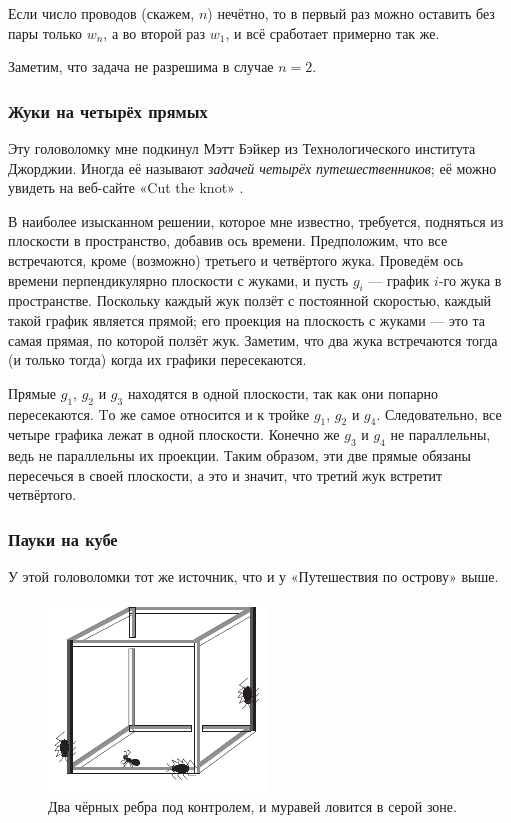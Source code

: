 Если число проводов (скажем, $n$) нечётно, то в первый раз можно оставить без пары только $w_n$, а во второй раз $w_1$, и всё сработает примерно так же.

\begin{addedbytheeditors}
Заметим, что задача не разрешима в случае $n=2$.
\end{addedbytheeditors}




\subsubsection*{Жуки на четырёх прямых}

Эту головоломку мне подкинул Мэтт Бэйкер из Технологического института Джорджии.
Иногда её называют \emph{задачей четырёх путешественников};
её можно увидеть на веб-сайте «Cut the knot» \cite{cut-the-knot}.

В наиболее изысканном решении, которое мне известно, требуется, подняться из плоскости в пространство, добавив ось времени.
Предположим, что все встречаются, кроме (возможно) третьего и четвёртого жука.
Проведём ось времени перпендикулярно плоскости с жуками, и пусть $g_i$ --- график $i$-го жука в пространстве.
Поскольку каждый жук ползёт с постоянной скоростью, каждый такой график является прямой;
его проекция на плоскость с жуками --- это та самая прямая, по которой ползёт жук.
Заметим, что два жука встречаются тогда (и только тогда) когда их графики пересекаются.

Прямые $g_1$, $g_2$ и $g_3$ находятся в одной плоскости, так как они попарно пересекаются.
Tо же самое относится и к тройке  $g_1$, $g_2$ и $g_4$.
Следовательно, все четыре графика лежат в одной плоскости.
Конечно же $g_3$ и $g_4$ не параллельны, ведь не параллельны их проекции.
Таким образом, эти две прямые обязаны пересечься в своей плоскости,
а это и значит, что третий жук встретит четвёртого.

\subsubsection*{Пауки на кубе}

У этой головоломки тот же источник, что и у «Путешествия по острову» выше.

\begin{figure}[ht!]
\centering
\includegraphics[scale=1]{pics/cube}
\caption{Два чёрных ребра под контролем, и муравей ловится в серой зоне.}
\label{pic:cube}
\end{figure}

